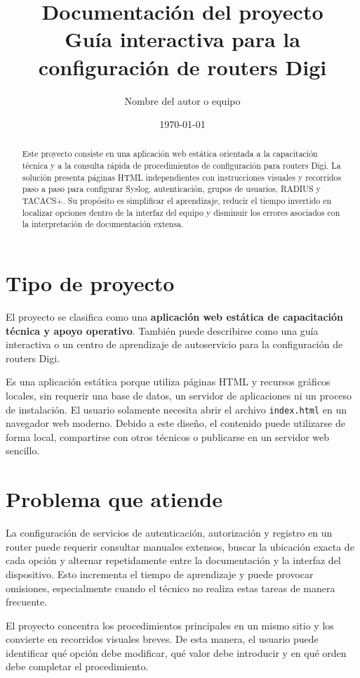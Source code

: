 \documentclass[12pt,letterpaper]{article}
\title{Documentación del proyecto\\[0.3em]
\large Guía interactiva para la configuración de routers Digi}
\author{Nombre del autor o equipo}
\date{\today}
\begin{document}
\maketitle

\begin{abstract}
Este proyecto consiste en una aplicación web estática orientada a la capacitación
técnica y a la consulta rápida de procedimientos de configuración para routers
Digi. La solución presenta páginas HTML independientes con instrucciones visuales
y recorridos paso a paso para configurar Syslog, autenticación, grupos de usuarios,
RADIUS y TACACS+. Su propósito es simplificar el aprendizaje, reducir el tiempo
invertido en localizar opciones dentro de la interfaz del equipo y disminuir los
errores asociados con la interpretación de documentación extensa.
\end{abstract}

\section{Tipo de proyecto}

El proyecto se clasifica como una \textbf{aplicación web estática de capacitación
técnica y apoyo operativo}. También puede describirse como una guía interactiva o
un centro de aprendizaje de autoservicio para la configuración de routers Digi.

Es una aplicación estática porque utiliza páginas HTML y recursos gráficos locales,
sin requerir una base de datos, un servidor de aplicaciones ni un proceso de
instalación. El usuario solamente necesita abrir el archivo \texttt{index.html} en
un navegador web moderno. Debido a este diseño, el contenido puede utilizarse de
forma local, compartirse con otros técnicos o publicarse en un servidor web
sencillo.

\section{Problema que atiende}

La configuración de servicios de autenticación, autorización y registro en un
router puede requerir consultar manuales extensos, buscar la ubicación exacta de
cada opción y alternar repetidamente entre la documentación y la interfaz del
dispositivo. Esto incrementa el tiempo de aprendizaje y puede provocar omisiones,
especialmente cuando el técnico no realiza estas tareas de manera frecuente.

El proyecto concentra los procedimientos principales en un mismo sitio y los
convierte en recorridos visuales breves. De esta manera, el usuario puede identificar
qué opción debe modificar, qué valor debe introducir y en qué orden debe completar
el procedimiento.
\end{document}
